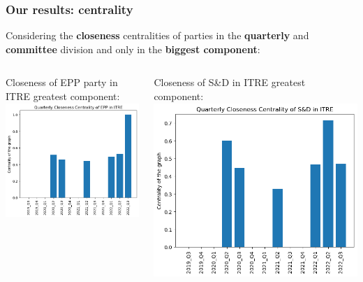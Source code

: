\documentclass{beamer}
\begin{document}
\begin{frame}
\frametitle{Our results: centrality}
	
	Considering the \textbf{closeness} centralities of parties in the \textbf{quarterly} and \textbf{committee} division and only in the \textbf{biggest component}:
	\vspace{4mm}
	\pause
	
\begin{columns}
	\begin{column}{0.5\textwidth}
	Closeness of EPP party in ITRE greatest component:
	\\
	\includegraphics[width=\textwidth]{img/EPP_ITRE_Q_closeness_BIG.png}
	\end{column}
	
	\pause 
	\begin{column}{0.5\textwidth}
	Closeness of S\&D in ITRE greatest component:
	\includegraphics[width=\textwidth]{img/S&D_ITRE_Q_closeness_BIG.png}
	\end{column}
\end{columns}

\end{frame}
\end{document}
